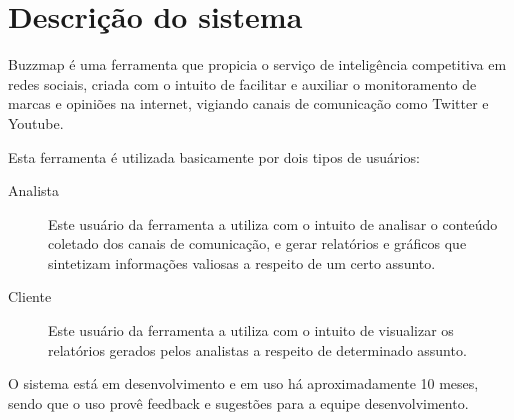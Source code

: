\section{Descrição do sistema}
Buzzmap é uma ferramenta que propicia o serviço de inteligência
competitiva em redes sociais, criada com o intuito de facilitar e
auxiliar o monitoramento de marcas e opiniões na internet, vigiando
canais de comunicação como Twitter e Youtube.

Esta ferramenta é utilizada basicamente por dois tipos de usuários:
\begin{description}
    \item[Analista] Este usuário da ferramenta a utiliza com o intuito
    de analisar o conteúdo coletado dos canais de comunicação, e gerar
    relatórios e gráficos que sintetizam informações valiosas a
    respeito de um certo assunto.

    \item[Cliente] Este usuário da ferramenta a utiliza com o intuito
    de visualizar os relatórios gerados pelos analistas a respeito de
    determinado assunto.
\end{description}

O sistema está em desenvolvimento e em uso há aproximadamente 10 meses,
sendo que o uso provê feedback e sugestões para a equipe
desenvolvimento.
